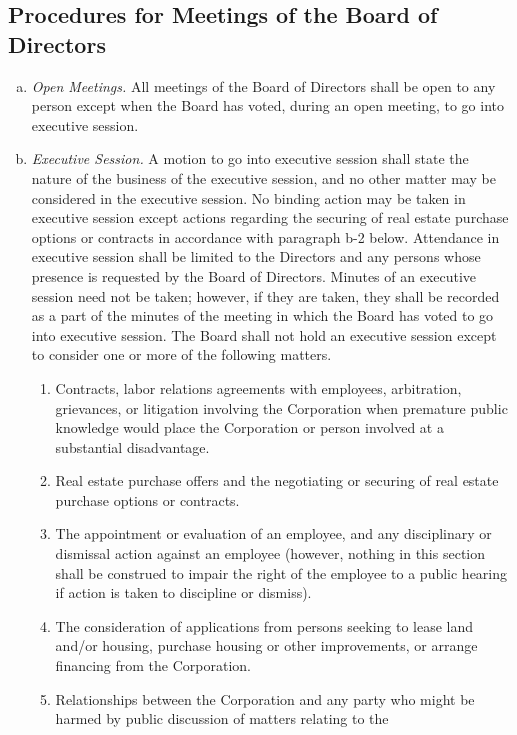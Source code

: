 \subsection{Procedures for Meetings of the Board of Directors}
\begin{enumerate}[a.]
\item \emph{Open Meetings.}  All meetings of the Board of Directors
  shall be open to any person except when the Board has voted, during
  an open meeting, to go into executive session.
\item \emph{Executive Session.}  A motion to go into executive session
  shall state the nature of the business of the executive session, and
  no other matter may be considered in the executive session. No
  binding action may be taken in executive session except actions
  regarding the securing of real estate purchase options or contracts
  in accordance with paragraph b-2 below. Attendance in executive
  session shall be limited to the Directors and any persons whose
  presence is requested by the Board of Directors. Minutes of an
  executive session need not be taken; however, if they are taken,
  they shall be recorded as a part of the minutes of the meeting in
  which the Board has voted to go into executive session. The Board
  shall not hold an executive session except to consider one or more
  of the following matters.
  \begin{enumerate}[(1)]
  \item Contracts, labor relations agreements with employees,
    arbitration, grievances, or litigation involving the Corporation
    when premature public knowledge would place the Corporation or
    person involved at a substantial disadvantage.
  \item Real estate purchase offers and the negotiating or securing of
    real estate purchase options or contracts.
  \item The appointment or evaluation of an employee, and any
    disciplinary or dismissal action against an employee (however,
    nothing in this section shall be construed to impair the right of
    the employee to a public hearing if action is taken to discipline
    or dismiss).
  \item The consideration of applications from persons seeking to
    lease land and/or housing, purchase housing or other improvements,
    or arrange financing from the Corporation.
  \item Relationships between the Corporation and any party who might
    be harmed by public discussion of matters relating to the

\end{enumerate}
\end{enumerate}

